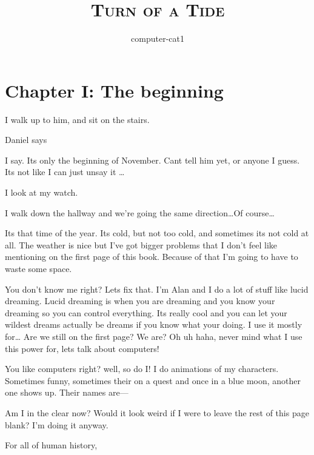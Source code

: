 \documentclass[a5paper]{article}
\title{\textsc{Turn of a Tide}}
\author{computer-cat1}
\date{}
\begin{document}
\maketitle
\thispagestyle{fancy}
\section[The Beginning]{Chapter I: The beginning}
I walk up to him, and sit on the stairs.

 Daniel says

 I say. Its only the beginning of November. 
Cant tell him yet, or anyone I guess. Its not like I 
can just unsay it \ldots{}

 I look at my watch.

 I walk down the hallway 
and we're going the same direction\ldots Of course\ldots

Its that time of the year. Its cold, but not too cold,
and sometimes its not cold at all.
The weather is nice but I've got bigger problems that I 
don't feel like mentioning on the first page of this book.
Because of that I'm going to have to waste some space. 

You
don't know me right? Lets fix that. I'm Alan and I do a 
lot of stuff like lucid dreaming. Lucid dreaming is when
you are dreaming and you know your dreaming so you can
control everything. Its really cool and you can let
your wildest dreams actually be dreams if you know what
your doing. I use it mostly for\ldots{} Are we still
on the first page? We are? Oh uh haha, never mind what
I use this power for, lets talk about computers!

You like computers right? well, so do I! I do animations
of my characters. Sometimes funny, sometimes their on a 
quest and once in a blue moon, another one shows up. 
Their names are--- 

Am I in the clear now? Would it look weird if I were
to leave the rest of this page blank? I'm doing it anyway.
\newpage

For all of human history, 
\end{document}
